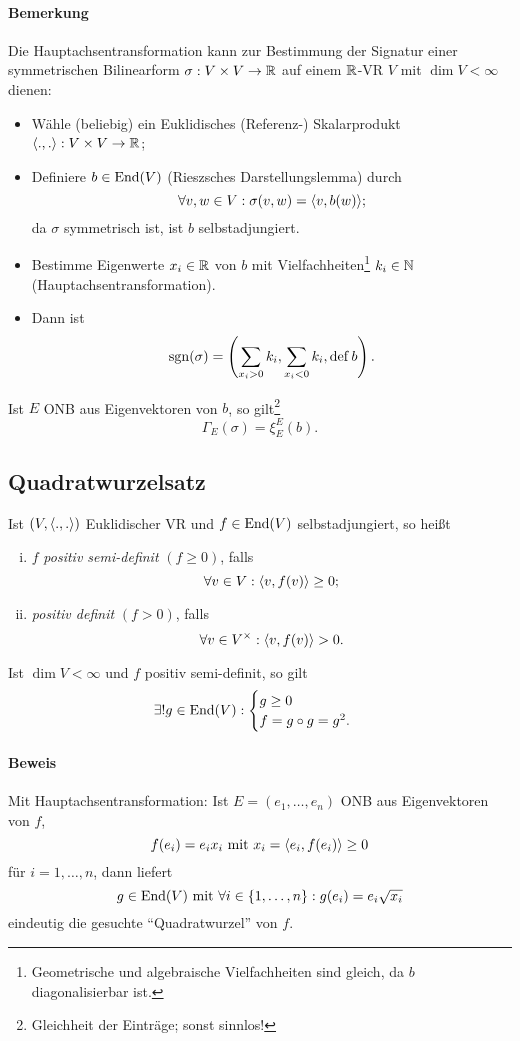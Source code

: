 \paragraph{Bemerkung}
	Die Hauptachsentransformation kann zur Bestimmung der Signatur einer symmetrischen Bilinearform $ \sigma:V\times V\to \mathbb{R} $ auf einem $ \mathbb{R} $-VR $ V $ mit $ \dim V <\infty $ dienen:
		\begin{itemize}
			\item Wähle (beliebig) ein Euklidisches (Referenz-) Skalarprodukt $ \langle .,. \rangle:V\times V\to \mathbb{R} $;
			\item Definiere $ b\in \operatorname{End}(V) $ (Rieszsches Darstellungslemma) durch
				\[ \forall v,w\in V: \sigma(v,w) = \langle v,b(w) \rangle; \]
			da $ \sigma $ symmetrisch ist, ist $ b $ selbstadjungiert.
			\item Bestimme Eigenwerte $ x_i\in \mathbb{R} $ von $ b $ mit Vielfachheiten\footnote{Geometrische und algebraische Vielfachheiten sind gleich, da $ b $ diagonalisierbar ist.} $ k_i\in \mathbb{N} $ (Hauptachsentransformation).
			\item Dann ist
				\[ \operatorname{sgn}(\sigma) = \left(\sum_{x_i>0}k_i, \sum_{x_i<0}k_i,\operatorname{def} b\right). \]
		\end{itemize}
	Ist $ E $ ONB aus Eigenvektoren von $ b $, so gilt\footnote{Gleichheit der Einträge; sonst sinnlos!}
		\[ \Gamma_E(\sigma) = \xi_E^E(b). \]
\subsection{Quadratwurzelsatz}
\begin{Satz}[Quadratwurzelsatz]
	Ist $ (V,\langle .,. \rangle) $ Euklidischer VR und $ f\in \operatorname{End}(V) $ selbstadjungiert, so heißt
		\begin{enumerate}[(i)]
			\item $ f $ \emph{positiv semi-definit} $ (f\geq 0) $, falls
				\[ \forall v\in V :\langle v,f(v) \rangle\geq 0;\]
			\item \emph{positiv definit} $ (f>0) $, falls
				\[ \forall v\in V^\times: \langle v,f(v) \rangle>0. \]
		\end{enumerate}
	Ist $ \dim V < \infty $ und $ f $ positiv semi-definit, so gilt
		\[ \exists! g\in \operatorname{End}(V): \begin{cases}
		g\geq 0\\f = g\circ g =g^2.
		\end{cases} \]
\end{Satz}
\paragraph{Beweis}
	Mit Hauptachsentransformation: Ist $ E = (e_1,\dots,e_n) $ ONB aus Eigenvektoren von $ f $,
		\[ f(e_i) = e_ix_i \text{ mit } x_i = \langle e_i,f(e_i) \rangle\geq 0 \]
	für $ i=1,\dots,n $, dann liefert
		\[ g\in\operatorname{End}(V) \text{ mit } \forall i\in \{1,\dots,n\}: g(e_i) = e_i\sqrt{x_i} \]
	eindeutig die gesuchte "`Quadratwurzel"' von $ f $.
